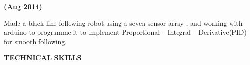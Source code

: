 \documentclass[letterpaper]{deedy-resume} %
\begin{document}
\microspace

\hfill {\textbf{(Aug 2014)}}\\
\begin{tightitemize}
\item Made a black line following robot using a seven sensor array , and working with arduino to programme it to implement Proportional – Integral – Derivative(PID) for smooth following.
\end{tightitemize}

\sectionspace

\microspace

\sectionspace

{\uppercase\uline{\textbf{\large{Technical Skills}}\hfill}}
\end{document}
